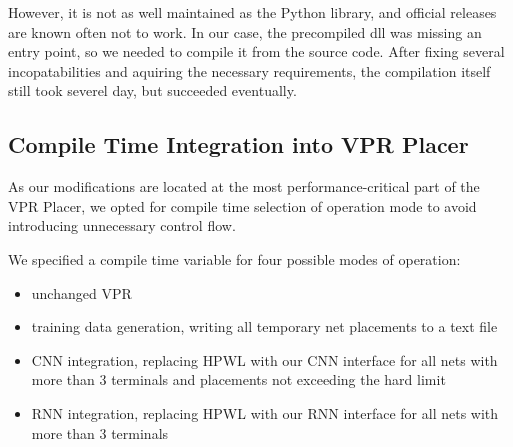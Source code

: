 However, it is not as well maintained as the Python library, and official releases are known often not to work. In our case, the precompiled dll was missing an entry point, so we needed to compile it from the source code. After fixing several incopatabilities and aquiring the necessary requirements, the compilation itself still took severel day, but succeeded eventually.

\subsection{Compile Time Integration into \gls{VPR} Placer}

As our modifications are located at the most performance-critical part of the \gls{VPR} Placer, we opted for compile time selection of operation mode to avoid introducing unnecessary control flow. 

We specified a compile time variable for four possible modes of operation: 

\begin{itemize}
	\item unchanged \gls{VPR}
	\item training data generation, writing all temporary net placements to a text file
	\item \gls{CNN} integration, replacing \gls{HPWL} with our \gls{CNN} interface for all nets with more than 3 terminals and placements not exceeding the hard limit
	\item \gls{RNN} integration, replacing \gls{HPWL} with our \gls{RNN} interface for all nets with more than 3 terminals
\end{itemize}
